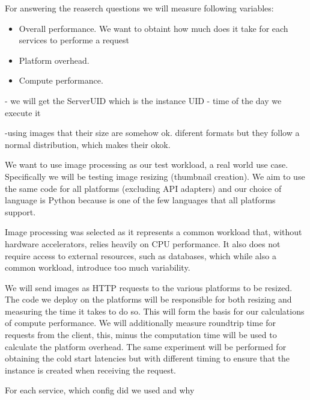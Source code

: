 \documentclass[11pt]{article}
\begin{document}

For answering the reaserch questions we will measure following variables:

\begin{itemize}
\item Overall performance. We want to obtaint how much does it take for each services to performe a request
\item Platform overhead.
\item Compute performance.
\end{itemize}


- we will get the ServerUID which is the instance UID
- time of the day we execute it



-using images that their size are somehow ok. diferent formats but they follow a normal distribution, which makes their okok.

We want to use image processing as our test workload, a real world \cite{ii} use case. Specifically we will be testing image resizing (thumbnail creation). We aim to use the same code for all platforms (excluding API adapters) and our choice of language is Python because is one of the few languages that all platforms support.

Image processing was selected as it represents a common workload that, without hardware accelerators, relies heavily on CPU performance. It also does not require access to external resources, such as databases, which while also a common workload, introduce too much variability.

We will send images as HTTP requests to the various platforms to be resized. The code we deploy on the platforms will be responsible for both resizing and measuring the time it takes to do so. This will form the basis for our calculations of compute performance. We will additionally measure roundtrip time for requests from the client, this, minus the computation time will be used to calculate the platform overhead.  The same experiment will be performed for obtaining the cold start latencies but with different timing to ensure that the instance is created when receiving the request.








For each service, which config did we used and why

\end{document}
